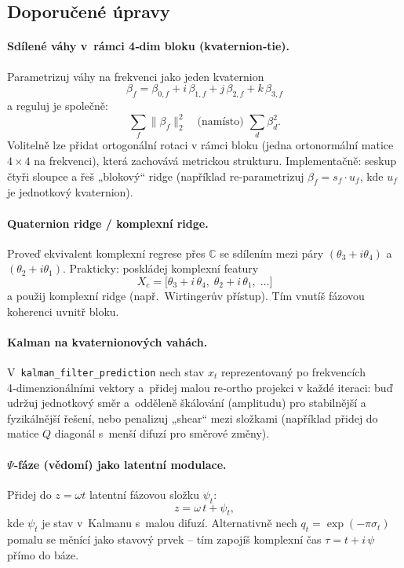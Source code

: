 \documentclass{article}
\begin{document}
\subsection*{Doporučené úpravy}

\paragraph{Sdílené váhy v rámci 4‑dim bloku (kvaternion‑tie).}
Parametrizuj váhy na frekvenci jako jeden kvaternion
\[
  \beta_f = \beta_{0,f} + i\,\beta_{1,f} + j\,\beta_{2,f} + k\,\beta_{3,f}
\]
a reguluj je společně:
\[
  \sum_f \|\beta_f\|_2^2
  \quad \text{(namísto) } 
  \sum_d \beta_d^2.
\]
Volitelně lze přidat ortogonální rotaci v rámci bloku (jedna ortonormální matice $4\times 4$ na frekvenci), která zachovává metrickou strukturu. Implementačně: seskup čtyři sloupce a řeš „blokový“ ridge (například re‑parametrizuj $\beta_f = s_f \cdot u_f$, kde $u_f$ je jednotkový kvaternion).

\paragraph{Quaternion ridge / komplexní ridge.}
Proveď ekvivalent komplexní regrese přes $\mathbb{C}$ se sdílením mezi páry $(\theta_3 + i\theta_4)$ a $(\theta_2 + i\theta_1)$. Prakticky: poskládej komplexní featury
\[
  X_c = \bigl[\theta_3 + i\,\theta_4,\;\theta_2 + i\,\theta_1,\;\ldots\bigr]
\]
a použij komplexní ridge (např. Wirtingerův přístup). Tím vnutíš fázovou koherenci uvnitř bloku.

\paragraph{Kalman na kvaternionových vahách.}
V \texttt{kalman\_filter\_prediction} nech stav $x_t$ reprezentovaný po frekvencích 4‑dimenzionálními vektory a přidej malou re‑ortho projekci v každé iteraci: buď udržuj jednotkový směr a odděleně škálování (amplitudu) pro stabilnější a fyzikálnější řešení, nebo penalizuj „shear“ mezi složkami (například přidej do matice $Q$ diagonál s menší difuzí pro směrové změny).

\paragraph{$\Psi$‑fáze (vědomí) jako latentní modulace.}
Přidej do $z=\omega t$ latentní fázovou složku $\psi_t$:
\[
  z = \omega\,t + \psi_t,
\]
kde $\psi_t$ je stav v Kalmanu s malou difuzí. Alternativně nech $q_t = \exp(-\pi \sigma_t)$ pomalu se měnící jako stavový prvek – tím zapojíš komplexní čas $\tau = t + i\,\psi$ přímo do báze.
\end{document}
